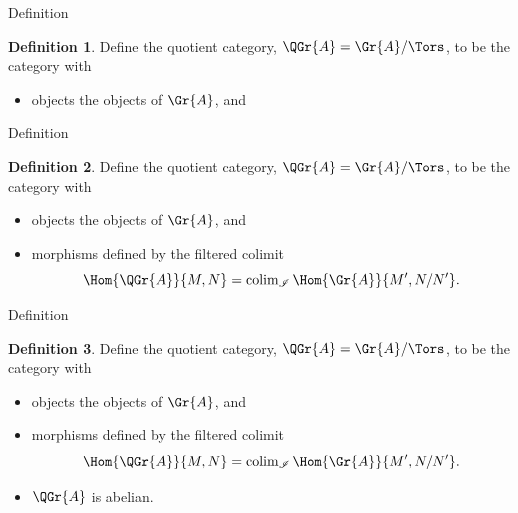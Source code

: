 \documentclass{beamer}
\theoremstyle{definition}
\newtheorem{defn}{Definition}
\begin{document}
\begin{frame}[fragile]{Definition}
  \setcounter{defn}{1}
  \begin{defn}
    Define the quotient category, $\QGr{A} = \Gr{A}/\Tors$, to be the category with
    \begin{itemize}
    \item
      objects the objects of $\Gr{A}$, and
    \end{itemize}
  \end{defn}
\end{frame}

\begin{frame}[fragile]{Definition}
  \setcounter{defn}{1}
  \begin{defn}
    Define the quotient category, $\QGr{A} = \Gr{A}/\Tors$, to be the category with
    \begin{itemize}
    \item
      objects the objects of $\Gr{A}$, and
    \item
      morphisms defined by the filtered colimit
      $$\Hom{\QGr{A}}{M,N} = \operatorname{colim}_{\mathscr{I}} \Hom{\Gr{A}}{M^\prime, N/N^\prime}.$$
    \end{itemize}
  \end{defn}
\end{frame}

\begin{frame}[fragile]{Definition}
  \setcounter{defn}{1}
  \begin{defn}
    Define the quotient category, $\QGr{A} = \Gr{A}/\Tors$, to be the category with
    \begin{itemize}
    \item
      objects the objects of $\Gr{A}$, and
    \item
      morphisms defined by the filtered colimit
      $$\Hom{\QGr{A}}{M,N} = \operatorname{colim}_{\mathscr{I}} \Hom{\Gr{A}}{M^\prime, N/N^\prime}.$$
    \end{itemize}
  \end{defn}
  \begin{itemize}
  \item
    $\QGr{A}$ is abelian.
  \end{itemize}
\end{frame}
\end{document}
